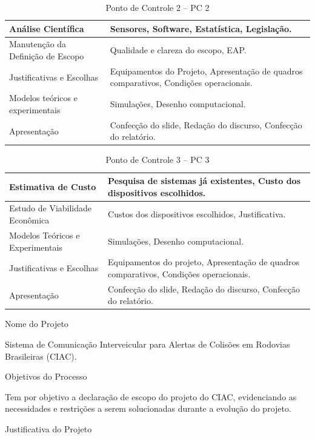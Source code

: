 \begin{table}[]
\centering
\caption{Ponto de Controle 2 – PC 2}
\label{custo_equip}
\begin{tabular}{|p{4cm}|p{5cm}|}
  \hline
  Análise Científica & Sensores, Software, Estatística, Legislação. \\
  \hline
  Manutenção da Definição de Escopo & Qualidade e clareza do escopo, EAP. \\
  \hline
  Justificativas e Escolhas & Equipamentos do Projeto, Apresentação de quadros comparativos, Condições operacionais. \\
  \hline
  Modelos teóricos e experimentais & Simulações, Desenho computacional. \\
  \hline
  Apresentação & Confecção do slide, Redação do discurso, Confecção do relatório. \\
  \hline

\end{tabular}
\end{table}


\begin{table}[]
\centering
\caption{Ponto de Controle 3 – PC  3}
\label{custo_equip}
\begin{tabular}{|p{4cm}|p{5cm}|}
  \hline
  Estimativa de Custo & Pesquisa de sistemas já existentes, Custo dos dispositivos escolhidos. \\
  \hline
  Estudo de Viabilidade Econômica & Custos dos dispositivos escolhidos, Justificativa. \\
  \hline
  Modelos Teóricos e Experimentais & Simulações, Desenho computacional. \\
  \hline
  Justificativas e Escolhas & Equipamentos do projeto, Apresentação de quadros comparativos, Condições operacionais. \\
  \hline
  Apresentação & Confecção do slide, Redação do discurso, Confecção do relatório. \\
  \hline
\end{tabular}
\end{table}


Nome do Projeto

Sistema de Comunicação Interveicular para Alertas de Colisões em Rodovias Brasileiras (CIAC).

Objetivos do Processo

Tem por objetivo a declaração de escopo do projeto do CIAC, evidenciando as necessidades e restrições a serem solucionadas durante a evolução do projeto.

Justificativa do Projeto

